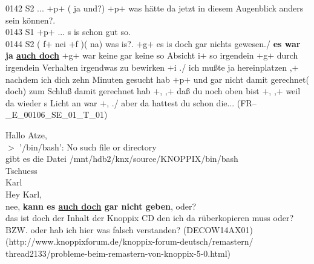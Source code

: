 {\begin{exe}
	\ex\label{840}
	\scriptsize
	0142 S2 ... $\plus$p$\plus$ ( ja und?) $\plus$p$\plus$ was hätte da jetzt in diesem Augenblick anders sein können?.\\
	0143 S1	$\plus$p$\plus$ ... s is schon gut so.\\
	0144 S2	( f$\plus$ nei $\plus$f )( na) was is?. $\plus$g$\plus$ es is doch gar nichts gewesen./ \textbf{es war ja \underline{auch doch}} $\plus$g$			\plus$ war keine gar keine so Absicht i$\plus$ so irgendein $\plus$g$\plus$ durch irgendein Verhalten irgendwas zu bewirken $\plus$i ./ ich mußte 		ja hereinplatzen ,$\plus$ nachdem ich dich zehn Minuten gesucht hab $\plus$p$\plus$ und gar nicht damit gerechnet( doch) zum Schluß damit gerechnet 	hab $\plus$, ,$\plus$ daß du noch oben bist $\plus$, ,$\plus$ weil da wieder s Licht an war $\plus$, ./ aber da hattest du schon die...                              
	\hfill\hbox{(FR--\_E\_00106\_SE\_01\_T\_01)}
\end{exe}											     				

\begin{exe}
	\ex\label{841}
	\scriptsize
	Hallo Atze,\\
	$>$ '/bin/bash': No such file or directory\\
	gibt es die Datei /mnt/hdb2/knx/source/KNOPPIX/bin/bash\\
	Tschuess\\
	Karl\\
	
	\noindent
	Hey Karl,\\
	nee, \textbf{kann es \underline{auch doch} gar nicht geben}, oder?\\
	das ist doch der Inhalt der Knoppix CD den ich da rüberkopieren muss oder?\\
	BZW. oder hab ich hier was falsch verstanden? 
	\hfill\hbox{(DECOW14AX01)}
	\newline
	\hbox{}\hfill\hbox{(http://www.knoppixforum.de/knoppix-forum-deutsch/remastern/}
	\newline
	\hbox{}\hfill\hbox{thread2133/probleme-beim-remastern-von-knoppix-5-0.html)}
\end{exe}

}

